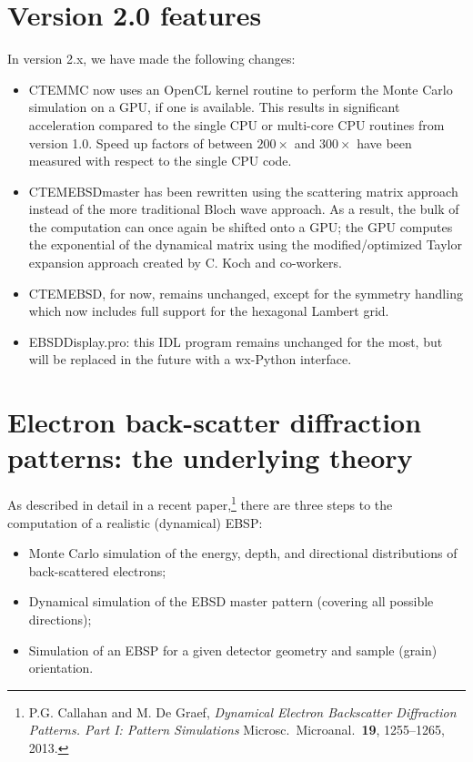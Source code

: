 \documentclass[DIV=calc, paper=letter, fontsize=11pt]{scrartcl}	 %
\begin{document}
\section{Version 2.0 features}
In version 2.x, we have made the following changes:
\begin{itemize}
	\item \textsf{CTEMMC} now uses an OpenCL kernel routine to perform the Monte Carlo simulation on a GPU, if one is available.  This results in significant acceleration compared to the single CPU or multi-core CPU routines from version 1.0.  Speed up factors of between $200\times$ and $300\times$ have been measured with respect to the single CPU code.
	\item \textsf{CTEMEBSDmaster} has been rewritten using the scattering matrix approach instead of the more traditional Bloch wave approach.  As a result, the bulk of the computation can once again be shifted onto a GPU; the GPU computes the exponential of the dynamical matrix using the modified/optimized Taylor expansion approach created by C. Koch and co-workers.
	\item \textsf{CTEMEBSD}, for now, remains unchanged, except for the symmetry handling which now includes full support for the hexagonal Lambert grid.
	\item \textsf{EBSDDisplay.pro}: this IDL program remains unchanged for the most, but will be replaced in the future with a \textsf{wx}-Python interface.
\end{itemize}

\newpage
\section{Electron back-scatter diffraction patterns: the underlying theory\label{sec:theory}}
As described in detail in a recent paper,\footnote{P.G. Callahan and M. De Graef, \textit{Dynamical Electron Backscatter Diffraction Patterns. Part I: Pattern Simulations}
Microsc.\ Microanal.\ \textbf{19}, 1255--1265, 2013.} there are three steps to the computation of a realistic (dynamical) EBSP:
\begin{itemize}
	\item Monte Carlo simulation of the energy, depth, and directional distributions of back-scattered electrons;
	\item Dynamical simulation of the EBSD master pattern (covering all possible directions);
	\item Simulation of an EBSP for a given detector geometry and sample (grain) orientation.
\end{itemize}
\end{document}
